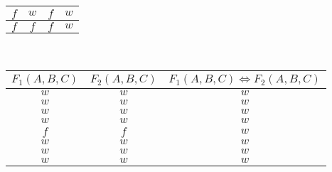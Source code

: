 \begin{table*}[h]
\begin{minipage}{.4\linewidth}
\begin{tabular}{|c|c|c|c|}
            $f$ & $w$ & $f$ & $w$ \\
            \hline
            $f$ & $f$ & $f$ & $w$ \\
            \hline
        \end{tabular}
    \end{minipage}  \\[15pt]
    \begin{minipage}{1\linewidth}
        \centering
        \begin{tabular}{|c|c|c|}
            \hline
            $F_1(A, B, C)$ & $F_2(A, B, C)$ & $F_1(A, B, C) \Leftrightarrow F_2(A, B, C)$ \\
            \hline
            $w$ & $w$ & $w$ \\
            \hline
            $w$ & $w$ & $w$ \\
            \hline
            $w$ & $w$ & $w$ \\
            \hline
            $w$ & $w$ & $w$ \\
            \hline
            $f$ & $f$ & $w$ \\
            \hline
            $w$ & $w$ & $w$ \\
            \hline
            $w$ & $w$ & $w$ \\
            \hline
            $w$ & $w$ & $w$ \\
            \hline
        \end{tabular}
    \end{minipage}
\end{table*}
